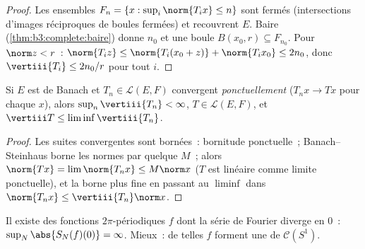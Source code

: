 \begin{proof}
Les ensembles $F_n = \{x : \sup_i\norm{T_ix} \leq n\}$ sont
fermés (intersections d'images réciproques de boules fermées)
et recouvrent $E$. Baire (\cref{thm:b3:complete:baire}) donne
$n_0$ et une boule $B(x_0, r) \subseteq F_{n_0}$. Pour $\norm z
< r$~: $\norm{T_iz} \leq \norm{T_i(x_0 + z)} +
\norm{T_ix_0} \leq 2n_0$, donc $\vertiii{T_i} \leq 2n_0/r$ pour
tout $i$.
\end{proof}

\begin{corollary}\label{cor:b3:banach:bslimits}
Si $E$ est de Banach et $T_n \in \mathcal L(E,F)$ convergent
\emph{ponctuellement} ($T_nx \to Tx$ pour chaque $x$), alors
$\sup_n \vertiii{T_n} < \infty$, $T \in \mathcal L(E, F)$, et
$\vertiii T \leq \liminf \vertiii{T_n}$.
\end{corollary}

\begin{proof}
Les suites convergentes sont bornées~: bornitude ponctuelle~;
Banach--Steinhaus borne les normes par quelque $M$~; alors
$\norm{Tx} = \lim\norm{T_nx} \leq M\norm x$ ($T$ est linéaire
comme limite ponctuelle), et la borne plus fine en passant au
$\liminf$ dans $\norm{T_nx} \leq \vertiii{T_n}\norm x$.
\end{proof}

\begin{theorem}
\label{thm:b3:banach:fourierdiverge}
Il existe des fonctions  $2\pi$-périodiques $f$ dont
la série de Fourier diverge en $0$~: $\sup_N\abs{S_N(f)(0)} =
\infty$. Mieux~: de telles $f$ forment une  de
$\mathcal C(S^1)$.
\end{theorem}

